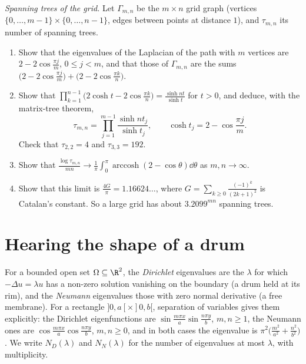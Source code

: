 \begin{exercise}[Journey]\label{pb:gridtrees}
\emph{Spanning trees of the grid.} Let $\Gamma_{m,n}$ be the $m\times n$ grid graph (vertices $\{0,\dots,m-1\}\times\{0,\dots,n-1\}$, edges between points at distance $1$), and
$\tau_{m,n}$ its number of spanning trees.
\begin{enumerate}[label=(\alph*)]
\item Show that the eigenvalues of the Laplacian of the path with $m$ vertices are $2-2\cos\frac{\pi j}m$, $0\le j<m$, and that those of $\Gamma_{m,n}$ are the sums
$\bigl(2-2\cos\frac{\pi j}m\bigr)+\bigl(2-2\cos\frac{\pi k}n\bigr)$.
\item Show that $\prod_{k=1}^{n-1}\bigl(2\cosh t-2\cos\frac{\pi k}n\bigr)=\frac{\sinh nt}{\sinh t}$ for $t>0$, and deduce, with the matrix-tree theorem,
\[
\tau_{m,n}=\prod_{j=1}^{m-1}\frac{\sinh nt_j}{\sinh t_j},\qquad\cosh t_j=2-\cos\frac{\pi j}m.
\]
Check that $\tau_{2,2}=4$ and $\tau_{3,3}=192$.
\item Show that $\frac{\log\tau_{m,n}}{mn}\to\frac1\pi\int_0^\pi\operatorname{arccosh}(2-\cos\theta)\dd\theta$ as $m,n\to\infty$.
\item Show that this limit is $\frac{4G}\pi=1.16624\ldots$, where $G=\sum_{k\ge0}\frac{(-1)^k}{(2k+1)^2}$ is Catalan's constant. So a large grid has about $3.2099^{mn}$ spanning trees.
\end{enumerate}
\end{exercise}

\section{Hearing the shape of a drum}

For a bounded open set $\Omega\subseteq\R^2$, the \emph{Dirichlet} eigenvalues are the $\lambda$ for which $-\Delta u=\lambda u$ has a non-zero solution vanishing on the boundary
(a drum held at its rim), and the \emph{Neumann} eigenvalues those with zero normal derivative (a free membrane). For a rectangle $]0,a[\times]0,b[$, separation of variables gives
them explicitly: the Dirichlet eigenfunctions are $\sin\frac{m\pi x}a\sin\frac{n\pi y}b$, $m,n\ge1$, the Neumann ones are $\cos\frac{m\pi x}a\cos\frac{n\pi y}b$, $m,n\ge0$, and in both
cases the eigenvalue is $\pi^2\bigl(\frac{m^2}{a^2}+\frac{n^2}{b^2}\bigr)$. We write $N_D(\lambda)$ and $N_N(\lambda)$ for the number of eigenvalues at most $\lambda$, with multiplicity.

